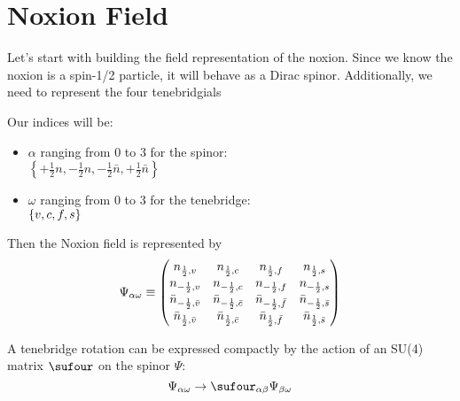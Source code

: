 \section{Noxion Field}
Let's start with building the field representation of the noxion. Since we know the noxion is a spin-1/2 particle, it will behave as a Dirac spinor. Additionally, we need to represent the four tenebridgials
\begin{definition}
  Our indices will be:
  \begin{itemize}
    \item \(\alpha\) ranging from 0 to 3 for the spinor:\\
          \(\left\{+\frac{1}{2}n,-\frac{1}{2}n,-\frac{1}{2}\bar{n},+\frac{1}{2}\bar{n} \right\}\)
    \item \(\omega\) ranging from 0 to 3 for the tenebridge:\\
          \(\left\{v, c, f, s\right\}\)
  \end{itemize}
  Then the Noxion field is represented by
  \[
    \Psi_{\alpha \omega} \equiv
    \begin{pmatrix}
      n_{\frac{1}{2},v}              & n_{\frac{1}{2},c}              & n_{\frac{1}{2},f}              & n_{\frac{1}{2},s}              \\
      n_{-\frac{1}{2},v}             & n_{-\frac{1}{2},c}             & n_{-\frac{1}{2},f}             & n_{-\frac{1}{2},s}             \\
      \bar{n}_{-\frac{1}{2},\bar{v}} & \bar{n}_{-\frac{1}{2},\bar{c}} & \bar{n}_{-\frac{1}{2},\bar{f}} & \bar{n}_{-\frac{1}{2},\bar{s}} \\
      \bar{n}_{\frac{1}{2},\bar{v}}  & \bar{n}_{\frac{1}{2},\bar{c}}  & \bar{n}_{\frac{1}{2},\bar{f}}  & \bar{n}_{\frac{1}{2},\bar{s}}  \\
    \end{pmatrix}
  \]
\end{definition}

A tenebridge rotation can be expressed compactly by the action of an SU(4) matrix \(\sufour\) on the spinor \(\Psi\):
\[
  \Psi_{\alpha \omega} \rightarrow \sufour_{\alpha\beta} \Psi_{\beta \omega}
\]

